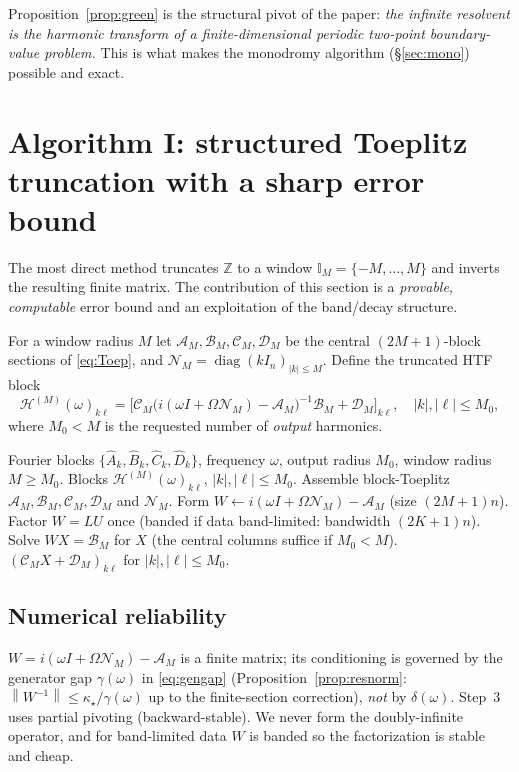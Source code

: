 \documentclass{amsart}
\theoremstyle{definition}
\DeclareMathOperator{\diag}{diag}
\newcommand{\Z}{\mathbb{Z}}
\newcommand{\norm}[1]{\left\lVert#1\right\rVert}
\newcommand{\Acal}{\mathcal{A}}
\newcommand{\Bcal}{\mathcal{B}}
\newcommand{\Ccal}{\mathcal{C}}
\newcommand{\Dcal}{\mathcal{D}}
\newcommand{\Hcal}{\mathcal{H}}
\newcommand{\Ncal}{\mathcal{N}}
\begin{document}
Proposition~\ref{prop:green} is the structural pivot of the paper: \emph{the
infinite resolvent is the harmonic transform of a finite-dimensional periodic
two-point boundary-value problem.} This is what makes the monodromy algorithm
(\S\ref{sec:mono}) possible and exact.

\section{Algorithm I: structured Toeplitz truncation with a sharp error bound}
\label{sec:trunc}

The most direct method truncates $\Z$ to a window
$\mathbb{I}_M=\{-M,\dots,M\}$ and inverts the resulting finite matrix. The
contribution of this section is a \emph{provable, computable} error bound and an
exploitation of the band/decay structure.

For a window radius $M$ let $\Acal_M,\Bcal_M,\Ccal_M,\Dcal_M$ be the central
$(2M{+}1)$-block sections of \eqref{eq:Toep}, and
$\Ncal_M=\diag(kI_n)_{|k|\le M}$. Define the truncated HTF block
\begin{equation}\label{eq:HTFtrunc}
\Hcal^{(M)}(\omega)_{k\ell}
=\big[\Ccal_M\big(i(\omega I+\Omega\Ncal_M)-\Acal_M\big)^{-1}\Bcal_M+\Dcal_M\big]_{k\ell},
\quad |k|,|\ell|\le M_0,
\end{equation}
where $M_0<M$ is the requested number of \emph{output} harmonics.

\begin{algorithm}[H]
\caption{Truncated harmonic-balance HTF at one frequency}\label{alg:trunc}
\begin{algorithmic}[1]
\Require Fourier blocks $\{\hat A_k,\hat B_k,\hat C_k,\hat D_k\}$, frequency $\omega$,
output radius $M_0$, window radius $M\ge M_0$.
\Ensure Blocks $\Hcal^{(M)}(\omega)_{k\ell}$, $|k|,|\ell|\le M_0$.
\State Assemble block-Toeplitz $\Acal_M,\Bcal_M,\Ccal_M,\Dcal_M$ and $\Ncal_M$.
\State Form $W\gets i(\omega I+\Omega\Ncal_M)-\Acal_M$ (size $(2M{+}1)n$).
\State Factor $W=LU$ once (banded if data band-limited: bandwidth $(2K{+}1)n$).
\State Solve $WX=\Bcal_M$ for $X$ (the central columns suffice if $M_0<M$).
\State \Return $(\Ccal_M X+\Dcal_M)_{k\ell}$ for $|k|,|\ell|\le M_0$.
\end{algorithmic}
\end{algorithm}

\subsection{Numerical reliability}
$W=i(\omega I+\Omega\Ncal_M)-\Acal_M$ is a finite matrix; its conditioning is
governed by the generator gap $\gamma(\omega)$ in \eqref{eq:gengap}
(Proposition~\ref{prop:resnorm}: $\norm{W^{-1}}\le\kappa_\star/\gamma(\omega)$ up to the finite-section correction), \emph{not} by $\delta(\omega)$. Step~3 uses partial pivoting
(backward-stable). We never form the doubly-infinite operator, and for
band-limited data $W$ is banded so the factorization is stable and cheap.
\end{document}
